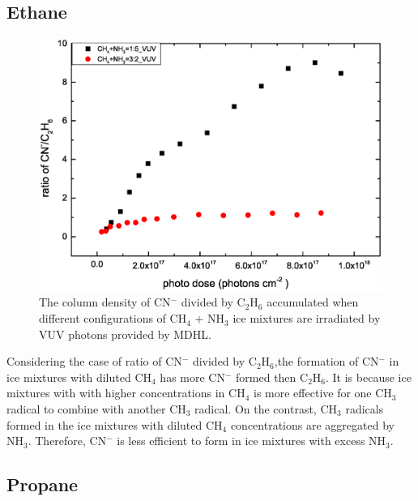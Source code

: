 \subsection{Ethane}


\begin{figure}
\centering
\includegraphics[width=\textwidth]{figures/chapter3/CN_C2H6.eps}
\caption{The column density of CN$^-$ divided by C$_2$H$_6$ accumulated when different configurations of CH$_4$ + NH$_3$ ice mixtures are irradiated by VUV photons provided by MDHL.}
\label{fig:C2H6_CN}
\end{figure}

Considering the case of ratio of CN$^-$ divided by C$_2$H$_6$,the formation of CN$^-$ in ice mixtures with diluted CH$_4$ has more CN$^-$ formed then C$_2$H$_6$. It is because ice mixtures with with higher concentrations in CH$_4$ is more effective for one CH$_3$ radical to combine with another CH$_3$ radical. On the contrast, CH$_3$ radicals formed in the ice mixtures with diluted CH$_4$ concentrations are aggregated by NH$_3$. Therefore, CN$^-$ is less efficient to form in ice mixtures with excess NH$_3$.

\subsection{Propane}

